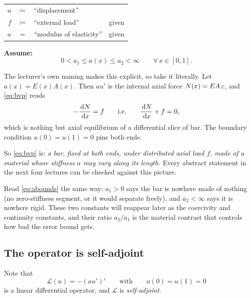 \noindent
\begin{tabular}{@{}r@{\;}c@{\;}l@{\qquad}l@{}}
$u$ & $\coloneqq$ & ``displacement''          & \\
$f$ & $\coloneqq$ & ``external load''         & given\\
$a$ & $=$      & ``modulus of elasticity'' & given\\
\end{tabular}

\medskip
\noindent\textbf{Assume:}
\begin{equation}\label{eq:abounds}
  0 < a_{1} \le a(x) \le a_{2} < \infty
  \qquad \forall\, x\in[0,1].
\end{equation}

\begin{mechanics}
The lecturer's own naming makes this explicit, so take it literally. Let
$a(x)=E(x)A(x)$. Then $a u'$ is the internal axial force $N(x) = EA\,\varepsilon$, and
\eqref{eq:bvp} reads
\[
  -\frac{\,\mathrm{d} N}{\,\mathrm{d} x} = f
  \qquad\text{i.e.}\qquad
  \frac{\,\mathrm{d} N}{\,\mathrm{d} x} + f = 0,
\]
which is nothing but axial equilibrium of a differential slice of bar. The
boundary condition $u(0)=u(1)=0$ pins both ends.

So \eqref{eq:bvp} is: \emph{a bar, fixed at both ends, under distributed axial
load $f$, made of a material whose stiffness $a$ may vary along its length.}
Every abstract statement in the next four lectures can be checked against this
picture.

Read \eqref{eq:abounds} the same way: $a_1>0$ says the bar is nowhere made of
nothing (no zero-stiffness segment, or it would separate freely), and
$a_2<\infty$ says it is nowhere rigid. These two constants will reappear later
as the coercivity and continuity constants, and their ratio $a_2/a_1$ is the
material contrast that controls how bad the error bound gets.
\end{mechanics}


\subsection*{The operator is self-adjoint}

Note that
\begin{equation}\label{eq:Ldef}
  \mathcal{L}(u) = -(a u')'
  \qquad\text{with}\qquad u(0)=u(1)=0
\end{equation}
is a linear differential operator, and $\mathcal{L}$ is \emph{self-adjoint}.

